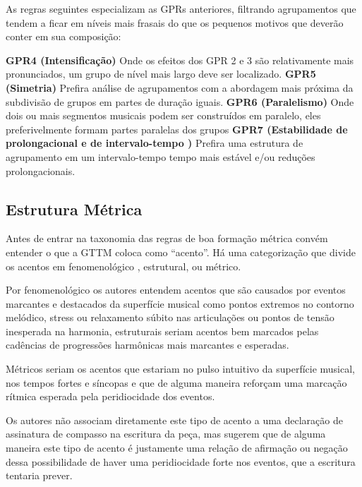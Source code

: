\documentclass[
	12pt,				%
	openright,			%
	twoside,			%
	a4paper,			%
	english,			%
	french,				%
	spanish,			%
	brazil				%
	]{abntex2}
\begin{document}
As regras seguintes especializam as GPRs anteriores, filtrando agrupamentos que tendem a ficar em níveis mais frasais do que os pequenos motivos que deverão conter em sua composição:

\begin{citacao}
\textbf{GPR4 (Intensificação)} Onde os efeitos dos GPR 2 e 3 são relativamente mais pronunciados, um grupo de nível mais largo deve ser localizado. \textbf{GPR5 (Simetria)} Prefira análise de agrupamentos com a abordagem mais próxima da subdivisão de grupos em partes de duração iguais. \textbf{GPR6 (Paralelismo)} Onde dois ou mais segmentos musicais podem ser construídos em paralelo, eles preferivelmente formam partes paralelas dos grupos \textbf{GPR7 (Estabilidade de prolongacional e de intervalo-tempo )} Prefira uma estrutura de agrupamento em um intervalo-tempo tempo mais estável e/ou reduções prolongacionais.
\cite[ pg.46-52]{lerdahl1983generative}
\end{citacao}


\subsection{Estrutura Métrica}

Antes de entrar na taxonomia das regras de boa formação métrica convém entender o que a GTTM coloca como “acento”. Há uma categorização que divide os acentos em fenomenológico , estrutural, ou métrico.

Por fenomenológico os autores entendem acentos que são causados por eventos marcantes e destacados da superfície musical como pontos extremos no contorno melódico, stress ou relaxamento súbito nas articulações ou pontos de tensão inesperada na harmonia, estruturais seriam acentos bem marcados pelas cadências de progressões harmônicas mais marcantes e esperadas.

Métricos seriam os acentos que estariam no pulso intuitivo da superfície musical, nos tempos fortes e síncopas e que de alguma maneira reforçam uma marcação rítmica esperada pela peridiocidade dos eventos. 

Os autores não associam diretamente este tipo de acento a uma declaração de assinatura de compasso na escritura da peça, mas sugerem que de alguma maneira este tipo de acento é justamente uma relação de afirmação ou negação dessa possibilidade de haver uma peridiocidade forte nos eventos, que a escritura tentaria prever. 
\end{document}

